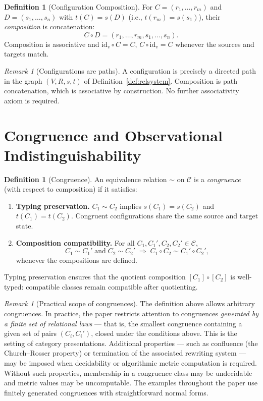 \documentclass{article}
\theoremstyle{definition}
\newtheorem{definition}[theorem]{Definition}
\theoremstyle{remark}
\newtheorem{remark}[theorem]{Remark}
\newcommand{\RC}{\mathcal{C}}
\newcommand{\id}{\mathrm{id}}
\begin{document}
\begin{definition}[Configuration Composition]
\label{def:confcomp}
For $C = (r_1, \dots, r_m)$ and $D = (s_1, \dots, s_n)$ with
$t(C) = s(D)$ (i.e., $t(r_m) = s(s_1)$), their
\emph{composition} is concatenation:
\[
  C \circ D = (r_1, \dots, r_m, s_1, \dots, s_n).
\]
Composition is associative and $\id_v \circ C = C$,
$C \circ \id_v = C$ whenever the sources and targets match.
\end{definition}

\begin{remark}[Configurations are paths]
A configuration is precisely a directed path in the graph
$(V, R, s, t)$ of Definition~\ref{def:relsystem}. Composition
is path concatenation, which is associative by construction.
No further associativity axiom is required.
\end{remark}

\section{Congruence and Observational Indistinguishability}
\label{sec:congruence}

\begin{definition}[Congruence]
\label{def:congruence}
An equivalence relation $\sim$ on $\RC$ is a \emph{congruence}
(with respect to composition) if it satisfies:
\begin{enumerate}[label=(\roman*)]
  \item \textbf{Typing preservation.}
        $C_1 \sim C_2$ implies $s(C_1) = s(C_2)$ and
        $t(C_1) = t(C_2)$. Congruent configurations share
        the same source and target state.
  \item \textbf{Composition compatibility.}
        For all $C_1, C_1', C_2, C_2' \in \RC$,
        \[
          C_1 \sim C_1' \;\text{and}\; C_2 \sim C_2'
          \;\Rightarrow\;
          C_1 \circ C_2 \sim C_1' \circ C_2',
        \]
        whenever the compositions are defined.
\end{enumerate}
Typing preservation ensures that the quotient composition
$[C_1] \circ [C_2]$ is well-typed: compatible classes remain
compatible after quotienting.
\end{definition}

\begin{remark}[Practical scope of congruences]
\label{rem:congruence_scope}
The definition above allows arbitrary congruences. In practice,
the paper restricts attention to congruences \emph{generated by
a finite set of relational laws} --- that is, the smallest
congruence containing a given set of pairs $(C_i, C_i')$, closed
under the conditions above. This is the setting of category
presentations. Additional properties --- such as confluence
(the Church--Rosser property) or termination of the associated
rewriting system --- may be imposed when decidability or
algorithmic metric computation is required. Without such
properties, membership in a congruence class may be
undecidable and metric values may be uncomputable. The examples
throughout the paper use finitely generated congruences with
straightforward normal forms.
\end{remark}
\end{document}
